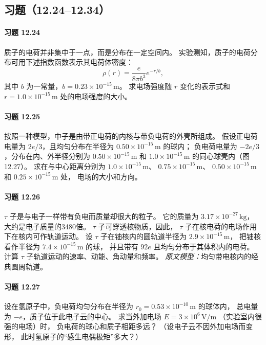 \subsection*{习题（12.24--12.34）}

\paragraph{习题 12.24}
质子的电荷并非集中于一点，而是分布在一定空间内。
实验测知，质子的电荷分布可用下述指数函数表示其电荷体密度：
\[
 \rho(r)=\frac{e}{8\pi b^3}e^{-r/b},
\]
其中 \(b\) 为一常量，\(b=0.23\times10^{-15}\,\mathrm m\)。
求电场强度随 \(r\) 变化的表示式和
\(r=1.0\times10^{-15}\,\mathrm m\) 处的电场强度的大小。

\paragraph{习题 12.25}
按照一种模型，中子是由带正电荷的内核与带负电荷的外壳所组成。
假设正电荷电量为 \(2e/3\)，且均匀分布在半径为
\(0.50\times10^{-15}\,\mathrm m\) 的球内；
负电荷电量为 \(-2e/3\)，分布在内、外半径分别为
\(0.50\times10^{-15}\,\mathrm m\) 和
\(1.0\times10^{-15}\,\mathrm m\) 的同心球壳内（图12.27）。
求在与中心距离分别为
\(1.0\times10^{-15}\,\mathrm m\)、
\(0.75\times10^{-15}\,\mathrm m\)、
\(0.50\times10^{-15}\,\mathrm m\) 和
\(0.25\times10^{-15}\,\mathrm m\) 处，
电场的大小和方向。

\paragraph{习题 12.26}
\(\tau\) 子是与电子一样带有负电而质量却很大的粒子。
它的质量为 \(3.17\times10^{-27}\,\mathrm{kg}\)，
大约是电子质量的3480倍。
\(\tau\) 子可穿透核物质，因此，
\(\tau\) 子在核电荷的电场作用下在核内可作轨道运动。
设 \(\tau\) 子在铀核内的圆轨道半径为
\(2.9\times10^{-15}\,\mathrm m\)，
把铀核看作半径为 \(7.4\times10^{-15}\,\mathrm m\) 的球，
并且带有 \(92e\) 且均匀分布于其体积内的电荷。
计算 \(\tau\) 子轨道运动的速率、动能、角动量和频率。
\textit{原文模型：}均匀带电核内的经典圆周轨道。

\paragraph{习题 12.27}
设在氢原子中，负电荷均匀分布在半径为
\(r_0=0.53\times10^{-10}\,\mathrm m\) 的球体内，
总电量为 \(-e\)，质子位于此电子云的中心。
求当外加电场
\(E=3\times10^6\,\mathrm{V/m}\)
（实验室内很强的电场）时，
负电荷的球心和质子相距多远？
（设电子云不因外加电场而变形，
此时氢原子的“感生电偶极矩”多大？）

